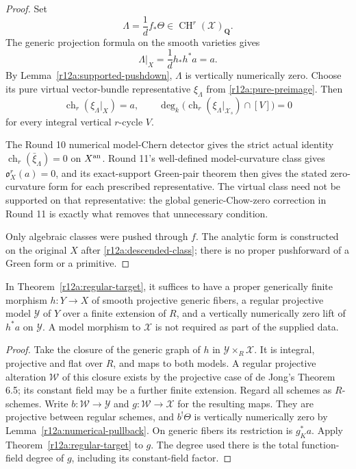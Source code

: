 \begin{proof}
Set
\[
                           \Lambda=\frac1d f_*\Theta
                      \in\operatorname{CH}^r(\mathcal X)_{\mathbf Q}.
\tag{ND5}\label{r12a:descended-class}
\]
The generic projection formula on the smooth varieties gives
\[
          \Lambda|_X=\frac1d h_*h^*a=a.
\]
By Lemma~\ref{r12a:supported-pushdown}, $\Lambda$ is vertically
numerically zero.  Choose its pure virtual vector-bundle representative
$\xi_\Lambda$ from \eqref{r12a:pure-preimage}.
Then
\[
 \operatorname{ch}_r(\xi_\Lambda|_X)=a,
 \qquad
 \deg_k\bigl(\operatorname{ch}_r(\xi_\Lambda|_{\mathcal X_s})
                                          \cap[V]\bigr)=0
\]
for every integral vertical $r$-cycle $V$.

The Round 10 numerical model-Chern detector gives the strict actual
identity $\operatorname{ch}_r(\bar\xi_\Lambda)=0$ on $X^{\rm an}$.
Round 11's well-defined model-curvature class gives
$\mathfrak o_X^r(a)=0$, and its exact-support Green-pair theorem then
gives the stated zero-curvature form for each prescribed representative.
The virtual class need not be supported on that representative: the
global generic-Chow-zero correction in Round 11 is exactly what removes
that unnecessary condition.

Only algebraic classes were pushed through $f$.  The analytic form is
constructed on the original $X$ after \eqref{r12a:descended-class};
there is no proper pushforward of a Green form or a primitive.
\end{proof}

\begin{corollary}
\label{r12a:generic-witness}
In Theorem~\ref{r12a:regular-target}, it suffices to have a proper
generically finite morphism $h:Y\to X$ of smooth projective generic
fibers, a regular projective model $\mathcal Y$ of $Y$ over a finite
extension of $R$, and a vertically numerically zero lift of $h^*a$
on $\mathcal Y$.  A model morphism to $\mathcal X$ is not required
as part of the supplied data.
\end{corollary}

\begin{proof}
Take the closure of the generic graph of $h$ in
$\mathcal Y\times_R\mathcal X$.  It is integral, projective and flat
over $R$, and maps to both models.  A regular projective alteration
$\mathcal W$ of this closure exists by the projective case of
de Jong's Theorem 6.5; its constant field may be a further finite
extension.  Regard all schemes as $R$-schemes.
Write $b:\mathcal W\to\mathcal Y$ and
$g:\mathcal W\to\mathcal X$ for the resulting maps.
They are projective between regular schemes, and
$b^!\Theta$ is vertically numerically zero by
Lemma~\ref{r12a:numerical-pullback}.  On generic fibers its restriction
is $g_K^*a$.  Apply Theorem~\ref{r12a:regular-target} to $g$.
The degree used there is the total function-field degree of $g$,
including its constant-field factor.
\end{proof}

